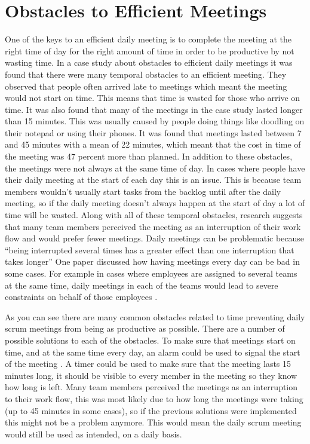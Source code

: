 \documentclass{scrartcl}
\begin{document}
\section{Obstacles to Efficient Meetings}

One of the keys to an efficient daily meeting is to complete the meeting at the right time of day for the right amount of time in order to be productive by not wasting time. In a case study about obstacles to efficient daily meetings \cite{Obstacles} it was found that there were many temporal obstacles to an efficient meeting. They observed that people often arrived late to meetings which meant the meeting would not start on time. This means that time is wasted for those who arrive on time. It was also found that many of the meetings in the case study lasted longer than 15 minutes. This was usually caused by people doing things like doodling on their notepad or using their phones. It was found that meetings lasted between 7 and 45 minutes with a mean of 22 minutes, which meant that the cost in time of the meeting was 47 percent more than planned. In addition to these obstacles, the meetings were not always at the same time of day. In cases where people have their daily meeting at the start of each day this is an issue. This is because team members wouldn't usually start tasks from the backlog until after the daily meeting, so if the daily meeting doesn't always happen at the start of day a lot of time will be wasted. Along with all of these temporal obstacles, research suggests that many team members perceived the meeting as an interruption of their work flow and would prefer fewer meetings. Daily meetings can be problematic because ``being interrupted several times has a
greater effect than one interruption that takes longer'' \cite{SoftwareProjects} One paper discussed how having meetings every day can be bad in some cases. For example in cases where employees are assigned to several teams at the same time, daily meetings in each of the teams would lead to severe constraints on behalf of those employees \cite{ScrumEveryDay}.

As you can see there are many common obstacles related to time preventing daily scrum meetings from being as productive as possible. There are a number of possible solutions to each of the obstacles. To make sure that meetings start on time, and at the same time every day, an alarm could be used to signal the start of the meeting \cite{Obstacles}.  A timer could be used to make sure that the meeting lasts 15 minutes long, it should be visible to every member in the meeting so they know how long is left. Many team members perceived the meetings as an interruption to their work flow, this was most likely due to how long the meetings were taking (up to 45 minutes in some cases), so if the previous solutions were implemented this might not be a problem anymore. This would mean the daily scrum meeting would still be used as intended, on a daily basis.    
\end{document}
